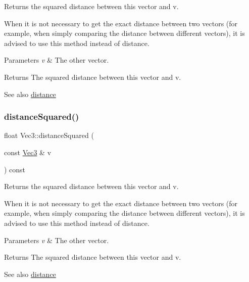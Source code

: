 Returns the squared distance between this vector and v.

When it is not necessary to get the exact distance between two vectors (for example, when simply comparing the distance between different vectors), it is advised to use this method instead of distance.


\begin{DoxyParams}{Parameters}
{\em v} & The other vector.\\
\hline
\end{DoxyParams}
\begin{DoxyReturn}{Returns}
The squared distance between this vector and v.
\end{DoxyReturn}
\begin{DoxySeeAlso}{See also}
\hyperlink{classVec3_ae63145f5152b7453d9f2047ccca8b89f}{distance} 
\end{DoxySeeAlso}
\mbox{\label{classVec3_acc8f986cd9f852f7872c10d26c651e2e}} 
\subsubsection{\texorpdfstring{distance\+Squared()}{distanceSquared()}\hspace{0.1cm}{\footnotesize\ttfamily [2/2]}}
{\footnotesize\ttfamily float Vec3\+::distance\+Squared (\begin{DoxyParamCaption}\item[{const \hyperlink{classVec3}{Vec3} \&}]{v }\end{DoxyParamCaption}) const}

Returns the squared distance between this vector and v.

When it is not necessary to get the exact distance between two vectors (for example, when simply comparing the distance between different vectors), it is advised to use this method instead of distance.


\begin{DoxyParams}{Parameters}
{\em v} & The other vector.\\
\hline
\end{DoxyParams}
\begin{DoxyReturn}{Returns}
The squared distance between this vector and v.
\end{DoxyReturn}
\begin{DoxySeeAlso}{See also}
\hyperlink{classVec3_ae63145f5152b7453d9f2047ccca8b89f}{distance} 
\end{DoxySeeAlso}
\mbox{\label{classVec3_a7dde977821ca85d8651f4c91e35d4275}} 
